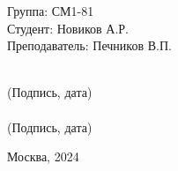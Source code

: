 \vspace{1cm}
\begin{flushright}
    \begin{minipage}{0.6\linewidth}
        \begin{flushleft}
            Группа: СМ1-81
            \\
            Студент: Новиков А.Р.
            \\
            \vspace{3ex}
            Преподаватель: Печников В.П.
        \end{flushleft}
    \end{minipage}
    \begin{minipage}{0.3\linewidth}
        \begin{center}
            \vspace{9ex}
            \underline{\hspace{5cm}} 
            \\
            \footnotesize (Подпись, дата)
            \\[10pt]
            \underline{\hspace{5cm}} 
            \\
            \footnotesize (Подпись, дата)
        \end{center}
    \end{minipage}
\end{flushright}
\begin{table}[b]
    \center Москва, 2024
\end{table}
\thispagestyle{empty}